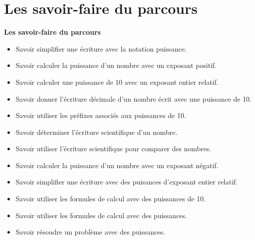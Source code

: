 \documentclass[a4paper,dvipsnames]{article}
\begin{document}

\section{Les savoir-faire du parcours}

 \begin{CpsCol}
  \textbf{Les savoir-faire du parcours}
  \begin{itemize}
  \item Savoir simplifier une écriture avec la notation puissance.
  \item Savoir calculer la puissance d'un nombre avec un exposant positif.
  \item Savoir calculer une puissance de 10 avec un exposant entier relatif.
  \item Savoir donner l'écriture décimale d'un nombre écrit avec une puissance de 10.
  \item Savoir utiliser les préfixes associés aux puissances de 10.
  \item Savoir déterminer l'écriture scientifique d'un nombre.
  \item Savoir utiliser l'écriture scientifique pour comparer des nombres.
  \item Savoir calculer la puissance d'un nombre avec un exposant négatif.
  \item Savoir simplifier une écriture avec des puisances d'exposant entier relatif.
  \item Savoir utiliser les formules de calcul avec des puissances de 10.
  \item Savoir utiliser les formules de calcul avec des puissances.
  \item Savoir résoudre un problème avec des puissances.
  \end{itemize}
 \end{CpsCol}
\end{document}
